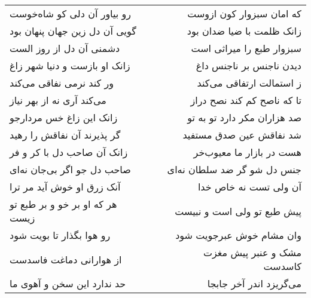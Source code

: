 \begin{center}
\begin{longtable}{l p{0.5cm} r}
\\
رو بیاور آن دلی کو شاه‌خوست
&&
که امان سبزوار کون ازوست
\\
گویی آن دل زین جهان پنهان بود
&&
زانک ظلمت با ضیا ضدان بود
\\
دشمنی آن دل از روز الست
&&
سبزوار طبع را میراثی است
\\
زانک او بازست و دنیا شهر زاغ
&&
دیدن ناجنس بر ناجنس داغ
\\
ور کند نرمی نفاقی می‌کند
&&
ز استمالت ارتفاقی می‌کند
\\
می‌کند آری نه از بهر نیاز
&&
تا که ناصح کم کند نصح دراز
\\
زانک این زاغ خس مردارجو
&&
صد هزاران مکر دارد تو به تو
\\
گر پذیرند آن نفاقش را رهید
&&
شد نفاقش عین صدق مستفید
\\
زانک آن صاحب دل با کر و فر
&&
هست در بازار ما معیوب‌خر
\\
صاحب دل جو اگر بی‌جان نه‌ای
&&
جنس دل شو گر ضد سلطان نه‌ای
\\
آنک زرق او خوش آید مر ترا
&&
آن ولی تست نه خاص خدا
\\
هر که او بر خو و بر طبع تو زیست
&&
پیش طبع تو ولی است و نبیست
\\
رو هوا بگذار تا بویت شود
&&
وان مشام خوش عبرجویت شود
\\
از هوارانی دماغت فاسدست
&&
مشک و عنبر پیش مغزت کاسدست
\\
حد ندارد این سخن و آهوی ما
&&
می‌گریزد اندر آخر جابجا
\\
\end{longtable}
\end{center}
